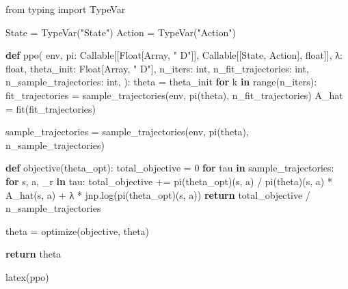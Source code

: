 \documentclass[
  letterpaper,
  DIV=11,
  numbers=noendperiod]{scrreprt}
\newenvironment{Shaded}{\begin{snugshade}}{\end{snugshade}}
\newcommand{\BuiltInTok}[1]{\textcolor[rgb]{0.00,0.23,0.31}{#1}}
\newcommand{\ControlFlowTok}[1]{\textcolor[rgb]{0.00,0.23,0.31}{\textbf{#1}}}
\newcommand{\DecValTok}[1]{\textcolor[rgb]{0.68,0.00,0.00}{#1}}
\newcommand{\ImportTok}[1]{\textcolor[rgb]{0.00,0.46,0.62}{#1}}
\newcommand{\KeywordTok}[1]{\textcolor[rgb]{0.00,0.23,0.31}{\textbf{#1}}}
\newcommand{\NormalTok}[1]{\textcolor[rgb]{0.00,0.23,0.31}{#1}}
\newcommand{\OperatorTok}[1]{\textcolor[rgb]{0.37,0.37,0.37}{#1}}
\newcommand{\StringTok}[1]{\textcolor[rgb]{0.13,0.47,0.30}{#1}}
\theoremstyle{plain}
\theoremstyle{plain}
\theoremstyle{definition}
\theoremstyle{definition}
\theoremstyle{remark}
\begin{document}
\begin{Shaded}
\begin{Highlighting}[]
\ImportTok{from}\NormalTok{ typing }\ImportTok{import}\NormalTok{ TypeVar}

\NormalTok{State }\OperatorTok{=}\NormalTok{ TypeVar(}\StringTok{"State"}\NormalTok{)}
\NormalTok{Action }\OperatorTok{=}\NormalTok{ TypeVar(}\StringTok{"Action"}\NormalTok{)}

\KeywordTok{def}\NormalTok{ ppo(}
\NormalTok{    env,}
\NormalTok{    pi: Callable[[Float[Array, }\StringTok{" D"}\NormalTok{]], Callable[[State, Action], }\BuiltInTok{float}\NormalTok{]],}
\NormalTok{    λ: }\BuiltInTok{float}\NormalTok{,}
\NormalTok{    theta\_init: Float[Array, }\StringTok{" D"}\NormalTok{],}
\NormalTok{    n\_iters: }\BuiltInTok{int}\NormalTok{,}
\NormalTok{    n\_fit\_trajectories: }\BuiltInTok{int}\NormalTok{,}
\NormalTok{    n\_sample\_trajectories: }\BuiltInTok{int}\NormalTok{,}
\NormalTok{):}
\NormalTok{    theta }\OperatorTok{=}\NormalTok{ theta\_init}
    \ControlFlowTok{for}\NormalTok{ k }\KeywordTok{in} \BuiltInTok{range}\NormalTok{(n\_iters):}
\NormalTok{        fit\_trajectories }\OperatorTok{=}\NormalTok{ sample\_trajectories(env, pi(theta), n\_fit\_trajectories)}
\NormalTok{        A\_hat }\OperatorTok{=}\NormalTok{ fit(fit\_trajectories)}

\NormalTok{        sample\_trajectories }\OperatorTok{=}\NormalTok{ sample\_trajectories(env, pi(theta), n\_sample\_trajectories)}
        
        \KeywordTok{def}\NormalTok{ objective(theta\_opt):}
\NormalTok{            total\_objective }\OperatorTok{=} \DecValTok{0}
            \ControlFlowTok{for}\NormalTok{ tau }\KeywordTok{in}\NormalTok{ sample\_trajectories:}
                \ControlFlowTok{for}\NormalTok{ s, a, \_r }\KeywordTok{in}\NormalTok{ tau:}
\NormalTok{                    total\_objective }\OperatorTok{+=}\NormalTok{ pi(theta\_opt)(s, a) }\OperatorTok{/}\NormalTok{ pi(theta)(s, a) }\OperatorTok{*}\NormalTok{ A\_hat(s, a) }\OperatorTok{+}\NormalTok{ λ }\OperatorTok{*}\NormalTok{ jnp.log(pi(theta\_opt)(s, a))}
            \ControlFlowTok{return}\NormalTok{ total\_objective }\OperatorTok{/}\NormalTok{ n\_sample\_trajectories}
        
\NormalTok{        theta }\OperatorTok{=}\NormalTok{ optimize(objective, theta)}

    \ControlFlowTok{return}\NormalTok{ theta}

\NormalTok{latex(ppo)}
\end{Highlighting}
\end{Shaded}
\end{document}
